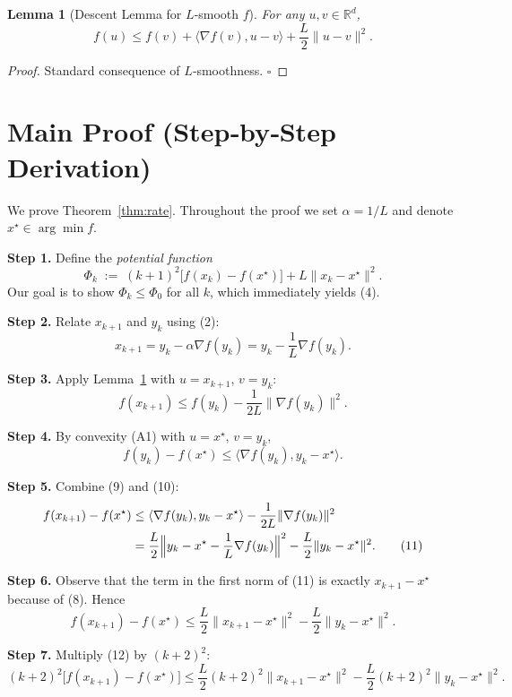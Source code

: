 \documentclass{article}
\newtheorem{lemma}{Lemma}
\newcommand{\R}{\mathbb{R}}
\begin{document}
\begin{lemma}[Descent Lemma for $L$‑smooth $f$]
\label{lem:descent}
For any $u,v\in\R^{d}$,
\[
f(u)\le f(v)+\langle\nabla f(v),u-v\rangle+\frac{L}{2}\|u-v\|^{2}.
\tag{6}
\]
\end{lemma}
\begin{proof}
Standard consequence of $L$‑smoothness. $\square$
\end{proof}

\newpage
\section*{Main Proof (Step‑by‑Step Derivation)}
We prove Theorem~\ref{thm:rate}. Throughout the proof we set $\alpha=1/L$ and denote $x^{\star}\in\arg\min f$.

\noindent\textbf{Step 1.} Define the \emph{potential function}
\[
\Phi_k \;:=\; (k+1)^{2}\bigl[f(x_k)-f(x^{\star})\bigr] + L\|x_k - x^{\star}\|^{2}. \tag{7}
\]
Our goal is to show $\Phi_k\le \Phi_0$ for all $k$, which immediately yields (4).

\noindent\textbf{Step 2.} Relate $x_{k+1}$ and $y_k$ using (2):
\[
x_{k+1}=y_k-\alpha\nabla f(y_k)=y_k-\frac{1}{L}\nabla f(y_k). \tag{8}
\]

\noindent\textbf{Step 3.} Apply Lemma~\ref{lem:descent} with $u=x_{k+1}$, $v=y_k$:
\[
f(x_{k+1})\le f(y_k)-\frac{1}{2L}\|\nabla f(y_k)\|^{2}. \tag{9}
\]

\noindent\textbf{Step 4.} By convexity (A1) with $u=x^{\star}$, $v=y_k$,
\[
f(y_k)-f(x^{\star})\le\langle\nabla f(y_k),y_k-x^{\star}\rangle. \tag{10}
\]

\noindent\textbf{Step 5.} Combine (9) and (10):
\[
\begin{aligned}
f(x_{k+1})-f(x^{\star})
&\le \langle\nabla f(y_k),y_k-x^{\star}\rangle -\frac{1}{2L}\|\nabla f(y_k)\|^{2} \\
&= \frac{L}{2}\Bigl\|y_k-x^{\star}-\frac{1}{L}\nabla f(y_k)\Bigr\|^{2}
   -\frac{L}{2}\|y_k-x^{\star}\|^{2}. \tag{11}
\end{aligned}
\]

\noindent\textbf{Step 6.} Observe that the term in the first norm of (11) is exactly $x_{k+1}-x^{\star}$ because of (8). Hence
\[
f(x_{k+1})-f(x^{\star})
\le \frac{L}{2}\|x_{k+1}-x^{\star}\|^{2}
    -\frac{L}{2}\|y_k-x^{\star}\|^{2}. \tag{12}
\]

\noindent\textbf{Step 7.} Multiply (12) by $(k+2)^{2}$:
\[
(k+2)^{2}\bigl[f(x_{k+1})-f(x^{\star})\bigr]
\le \frac{L}{2}(k+2)^{2}\|x_{k+1}-x^{\star}\|^{2}
    -\frac{L}{2}(k+2)^{2}\|y_k-x^{\star}\|^{2}. \tag{13}
\]
\end{document}
